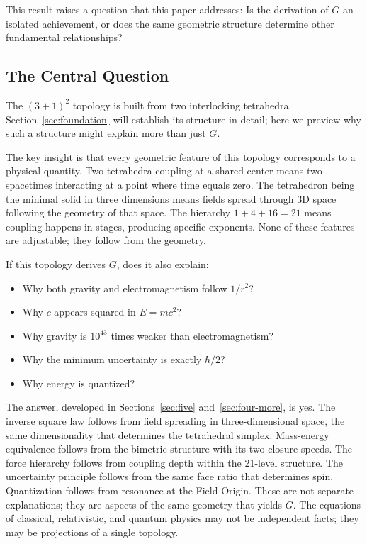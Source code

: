 \documentclass[aps,prd,preprint,superscriptaddress,showpacs,preprintnumbers,amsmath,amssymb,nofootinbib]{revtex4-2}
\begin{document}
This result raises a question that this paper addresses: Is the derivation of $G$ an isolated achievement, or does the same geometric structure determine other fundamental relationships?

\subsection{The Central Question}
\label{subsec:question}

The $(3+1)^2$ topology is built from two interlocking tetrahedra. Section~\ref{sec:foundation} will establish its structure in detail; here we preview why such a structure might explain more than just $G$.

The key insight is that every geometric feature of this topology corresponds to a physical quantity. Two tetrahedra coupling at a shared center means two spacetimes interacting at a point where time equals zero. The tetrahedron being the minimal solid in three dimensions means fields spread through 3D space following the geometry of that space. The hierarchy $1 + 4 + 16 = 21$ means coupling happens in stages, producing specific exponents. None of these features are adjustable; they follow from the geometry.

If this topology derives $G$, does it also explain:
\begin{itemize}
\item Why both gravity and electromagnetism follow $1/r^2$?
\item Why $c$ appears squared in $E = mc^2$?
\item Why gravity is $10^{43}$ times weaker than electromagnetism?
\item Why the minimum uncertainty is exactly $\hbar/2$?
\item Why energy is quantized?
\end{itemize}

The answer, developed in Sections~\ref{sec:five} and~\ref{sec:four-more}, is yes. The inverse square law follows from field spreading in three-dimensional space, the same dimensionality that determines the tetrahedral simplex. Mass-energy equivalence follows from the bimetric structure with its two closure speeds. The force hierarchy follows from coupling depth within the 21-level structure. The uncertainty principle follows from the same face ratio that determines spin. Quantization follows from resonance at the Field Origin. These are not separate explanations; they are aspects of the same geometry that yields $G$. The equations of classical, relativistic, and quantum physics may not be independent facts; they may be projections of a single topology.
\end{document}
